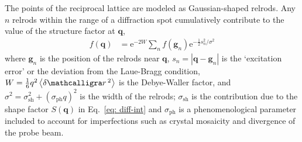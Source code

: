 The points of the reciprocal lattice are modeled as Gaussian-shaped relrods.
Any $n$ relrods within the range of a diffraction spot cumulatively contribute
to the value of the structure factor at $\boldsymbol{q}$,
%
\begin{equation}
  \begin{aligned}
    f(\boldsymbol{q}) & = \text{e}^{-2W} \sum_{n} f(\boldsymbol{g}_n) \text{e}^{- \frac{1}{2} s_n^2 / \sigma^2}
  \end{aligned}
  \label{eq: relrods}
\end{equation}
%
where $\boldsymbol{g}_n$ is the position of the relrods near $\boldsymbol{q}$,
$s_n = |\boldsymbol{q} - \boldsymbol{g}_n|$ is the `excitation error' or
the deviation from the Laue-Bragg condition,
$W = \frac{1}{6} q^2 \left< \delta \scriptr^2 \right> $ is the Debye-Waller factor,
and $\sigma^2 = \sigma_\text{sh}^2 + (\sigma_\text{ph} q)^2$ is the width of the relrods;
$\sigma_\text{sh}$ is the contribution due to the shape factor $S(\boldsymbol{q})$ in
Eq.~\eqref{eq: diff-int} and $\sigma_\text{ph}$ is
a phenomenological parameter included to account for imperfections such as
crystal mosaicity and divergence of the probe beam.

